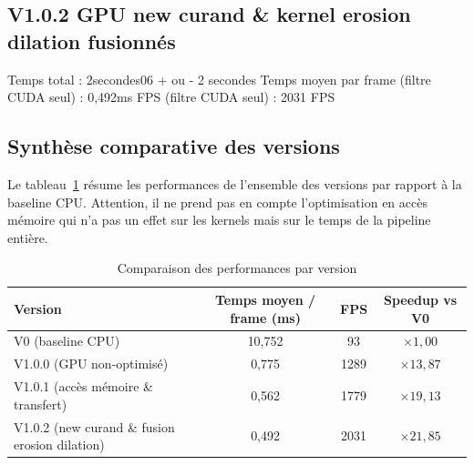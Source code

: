 \documentclass[12pt]{article}
\begin{document}
    \subsection{V1.0.2 GPU new curand \& kernel erosion dilation fusionnés}
    Temps total : 2secondes06 + ou - 2 secondes \newline
    Temps moyen par frame (filtre CUDA seul) : 0,492ms \newline
    FPS (filtre CUDA seul) : 2031 FPS \newline

    \bigskip

    \subsection{Synthèse comparative des versions}

    Le tableau~\ref{tab:synthese} résume les performances de l'ensemble des versions par rapport à la baseline CPU. \newline
    Attention, il ne prend pas en compte l'optimisation en accès mémoire qui n'a pas un effet sur les kernels mais sur le temps de la pipeline entière.

    \begin{table}[h!]
        \centering
        \begin{tabularx}{\textwidth}{>{\raggedright\arraybackslash}Xccc}
        \toprule
        \textbf{Version} & \textbf{Temps moyen / frame (ms)} & \textbf{FPS} & \textbf{Speedup vs V0} \\
        \midrule
        V0 (baseline CPU) & 10,752 & 93 & $\times 1,00$ \\
        V1.0.0 (GPU non-optimisé) & 0,775 & 1289 & $\times 13,87$ \\
        V1.0.1 (accès mémoire \& transfert) & 0,562 & 1779 & $\times 19,13$ \\
        V1.0.2 (new curand \& fusion erosion dilation) & 0,492 & 2031 & $\times 21,85$ \\
        \bottomrule
        \end{tabularx}
        \caption{Comparaison des performances par version}
        \label{tab:synthese}
    \end{table}
\end{document}
